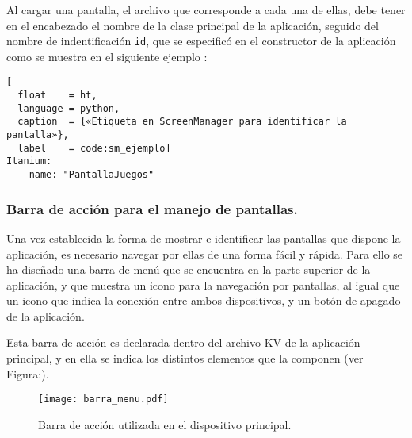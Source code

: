 Al cargar una pantalla, el archivo que corresponde a cada una de ellas, debe tener en el encabezado el nombre de la clase principal de la aplicación, seguido del nombre de indentificación \texttt{id}, que se especificó en el constructor de la aplicación como se muestra en el siguiente ejemplo \label{sm_ejemplo}:

\begin{lstlisting}[
  float    = ht,  
  language = python,
  caption  = {«Etiqueta en ScreenManager para identificar la pantalla»},
  label    = code:sm_ejemplo]
Itanium:
    name: "PantallaJuegos"
\end{lstlisting}

\subsubsection{Barra de acción para el manejo de pantallas.}
Una vez establecida la forma de mostrar e identificar las pantallas que dispone la aplicación, es necesario navegar por ellas de una forma fácil y rápida. Para ello se ha diseñado una barra de menú que se encuentra en la parte superior de la aplicación, y que muestra un icono para la navegación por pantallas, al igual que un icono que indica la conexión entre ambos dispositivos, y un botón de apagado de la aplicación.

Esta barra de acción es declarada dentro del archivo KV de la aplicación principal, y en ella se indica los distintos elementos que la componen (ver Figura:\label{barra_menu}).  
\begin{figure}[!h]
\begin{center}
\texttt{[image: barra\_menu.pdf]}
\caption{Barra de acción utilizada en el dispositivo principal. }
\label{fig:barra_menu}
\end{center}
\end{figure}


